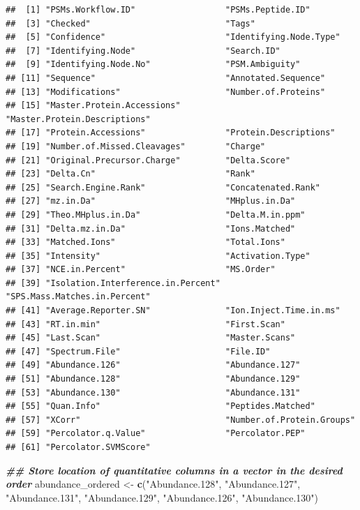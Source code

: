 \documentclass[9pt,a4paper,]{extarticle}
\newenvironment{Shaded}{\begin{snugshade}}{\end{snugshade}}
\newcommand{\DocumentationTok}[1]{\textcolor[rgb]{0.56,0.35,0.01}{\textbf{\textit{#1}}}}
\newcommand{\FunctionTok}[1]{\textcolor[rgb]{0.13,0.29,0.53}{\textbf{#1}}}
\newcommand{\NormalTok}[1]{#1}
\newcommand{\OtherTok}[1]{\textcolor[rgb]{0.56,0.35,0.01}{#1}}
\newcommand{\StringTok}[1]{\textcolor[rgb]{0.31,0.60,0.02}{#1}}
\begin{document}
\begin{verbatim}
##  [1] "PSMs.Workflow.ID"                  "PSMs.Peptide.ID"                  
##  [3] "Checked"                           "Tags"                             
##  [5] "Confidence"                        "Identifying.Node.Type"            
##  [7] "Identifying.Node"                  "Search.ID"                        
##  [9] "Identifying.Node.No"               "PSM.Ambiguity"                    
## [11] "Sequence"                          "Annotated.Sequence"               
## [13] "Modifications"                     "Number.of.Proteins"               
## [15] "Master.Protein.Accessions"         "Master.Protein.Descriptions"      
## [17] "Protein.Accessions"                "Protein.Descriptions"             
## [19] "Number.of.Missed.Cleavages"        "Charge"                           
## [21] "Original.Precursor.Charge"         "Delta.Score"                      
## [23] "Delta.Cn"                          "Rank"                             
## [25] "Search.Engine.Rank"                "Concatenated.Rank"                
## [27] "mz.in.Da"                          "MHplus.in.Da"                     
## [29] "Theo.MHplus.in.Da"                 "Delta.M.in.ppm"                   
## [31] "Delta.mz.in.Da"                    "Ions.Matched"                     
## [33] "Matched.Ions"                      "Total.Ions"                       
## [35] "Intensity"                         "Activation.Type"                  
## [37] "NCE.in.Percent"                    "MS.Order"                         
## [39] "Isolation.Interference.in.Percent" "SPS.Mass.Matches.in.Percent"      
## [41] "Average.Reporter.SN"               "Ion.Inject.Time.in.ms"            
## [43] "RT.in.min"                         "First.Scan"                       
## [45] "Last.Scan"                         "Master.Scans"                     
## [47] "Spectrum.File"                     "File.ID"                          
## [49] "Abundance.126"                     "Abundance.127"                    
## [51] "Abundance.128"                     "Abundance.129"                    
## [53] "Abundance.130"                     "Abundance.131"                    
## [55] "Quan.Info"                         "Peptides.Matched"                 
## [57] "XCorr"                             "Number.of.Protein.Groups"         
## [59] "Percolator.q.Value"                "Percolator.PEP"                   
## [61] "Percolator.SVMScore"
\end{verbatim}

\begin{Shaded}
\begin{Highlighting}[]
\DocumentationTok{\#\# Store location of quantitative columns in a vector in the desired order}
\NormalTok{abundance\_ordered }\OtherTok{\textless{}{-}} \FunctionTok{c}\NormalTok{(}\StringTok{"Abundance.128"}\NormalTok{,}
                       \StringTok{"Abundance.127"}\NormalTok{,}
                       \StringTok{"Abundance.131"}\NormalTok{,}
                       \StringTok{"Abundance.129"}\NormalTok{,}
                       \StringTok{"Abundance.126"}\NormalTok{,}
                       \StringTok{"Abundance.130"}\NormalTok{)}
\end{Highlighting}
\end{Shaded}
\end{document}
